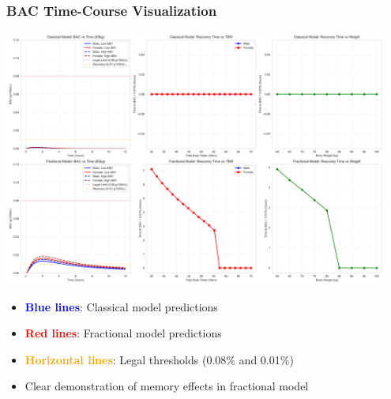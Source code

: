 \documentclass{beamer}
\begin{document}
\begin{frame}
\frametitle{BAC Time-Course Visualization}
\begin{center}
\includegraphics[width=0.95\textwidth]{bac_comparison.png}
\end{center}

\begin{itemize}
    \item \textcolor{blue}{\textbf{Blue lines}}: Classical model predictions
    \item \textcolor{red}{\textbf{Red lines}}: Fractional model predictions
    \item \textcolor{orange}{\textbf{Horizontal lines}}: Legal thresholds (0.08\% and 0.01\%)
    \item Clear demonstration of memory effects in fractional model
\end{itemize}
\end{frame}
\end{document}
